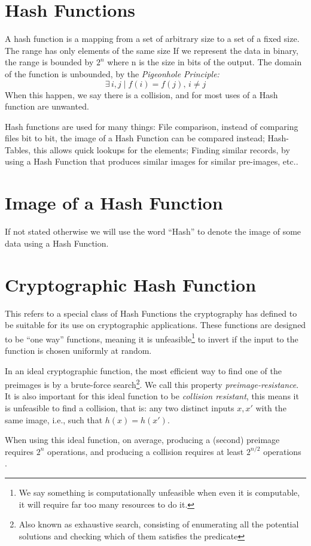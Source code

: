 \section{Hash Functions}
A hash function is a mapping from a set of arbitrary size to a set of a fixed
  size.
The range has only elements of the same size
If we represent the data in binary, the range is bounded by $2^n$ where n
  is the size in bits of the output.
The domain of the function is unbounded, by the \textit{Pigeonhole
  Principle:}
\begin{equation}
	\exists \, i, j \mid f(i) = f(j), \, i \neq j
\end{equation}
When this happen, we say there is a collision, and for most uses of a Hash
  function are unwanted.

Hash functions are used for many things: File comparison, instead of comparing
  files bit to bit, the image of a Hash Function can be compared instead;
  Hash-Tables, this allows quick lookups for the elements; Finding similar
  records, by using a Hash Function that produces similar images for similar
  pre-images, etc..

\section{Image of a Hash Function}

If not stated otherwise we will use the word ``Hash'' to denote the image of
  some data using a Hash Function.

\section{Cryptographic Hash Function}
This refers to a special class of Hash Functions the cryptography has defined
  to be suitable for its use on cryptographic applications. These functions are
  designed to be ``one way'' functions, meaning it is unfeasible\footnote{We %
  say something is computationally unfeasible when even it is computable, it
  will require far too many resources to do it.} to invert if the input to the
  function is chosen uniformly at random.

In an ideal cryptographic function, the most efficient way to find one of the
  preimages is by a brute-force search\footnote{Also known as exhaustive search,
  consisting of enumerating all the potential solutions and checking which of
  them satisfies the predicate}. We call this property
  \textit{preimage-resistance}.
It is also important for this ideal function to be \textit{collision
  resistant}, this means it is unfeasible to find a collision, that is: any two
  distinct inputs $x, x'$ with the same image, i.e., such that $h(x) = h(x')$.

When using this ideal function, on average, producing a (second) preimage
  requires $2^n$ operations, and producing a collision requires at least
  $2^{n / 2} $ operations \cite{preneel1993analysis}.

